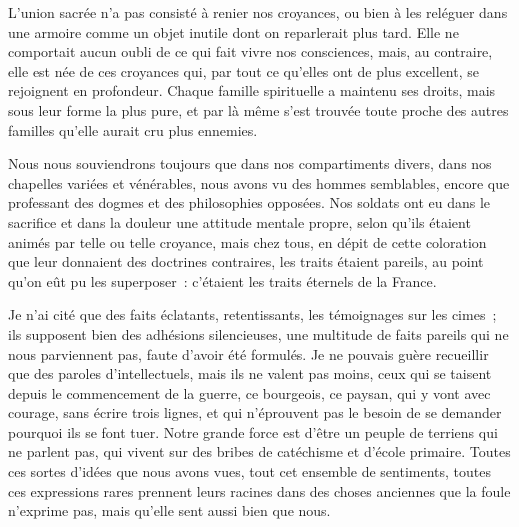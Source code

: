 \documentclass[french,twoside]{book} %
\begin{document}
L’union sacrée n’a pas consisté à renier nos croyances, ou bien à les reléguer dans une armoire comme un objet inutile dont on reparlerait plus tard. Elle ne comportait aucun oubli de ce qui fait vivre nos consciences, mais, au contraire, elle est née de ces croyances qui, par tout ce qu’elles ont de plus excellent, se rejoignent en profondeur. Chaque famille spirituelle a maintenu ses droits, mais sous leur forme la plus pure, et par là même s’est trouvée toute proche des autres familles qu’elle aurait cru plus ennemies.‌\par
Nous nous souviendrons toujours que dans nos compartiments divers, dans nos chapelles variées et vénérables, nous avons vu des hommes semblables, encore que professant des dogmes et des philosophies opposées. Nos soldats ont eu dans le sacrifice et dans la douleur une attitude mentale propre, selon qu’ils étaient animés par telle ou telle croyance, mais chez tous, en dépit de cette coloration que leur donnaient des doctrines contraires, les traits étaient pareils, au point qu’on eût pu les superposer : c’étaient les traits éternels de la France.‌\par
Je n’ai cité que des faits éclatants, retentissants, les témoignages sur les cimes ; ils supposent bien des adhésions silencieuses, une multitude de faits pareils qui ne nous parviennent pas, faute d’avoir été formulés. Je ne pouvais guère recueillir que des paroles d’intellectuels, mais ils ne valent pas moins, ceux qui se taisent depuis le commencement de la guerre, ce bourgeois, ce paysan, qui y vont avec courage, sans écrire trois lignes, et qui n’éprouvent pas le besoin de se demander pourquoi ils se font tuer. Notre grande force est d’être un peuple de terriens qui ne parlent pas, qui vivent sur des bribes de catéchisme et d’école primaire. Toutes ces sortes d’idées que nous avons vues, tout cet ensemble de sentiments, toutes ces expressions rares prennent leurs racines dans des choses anciennes que la foule n’exprime pas, mais qu’elle sent aussi bien que nous.‌\par
\end{document}
